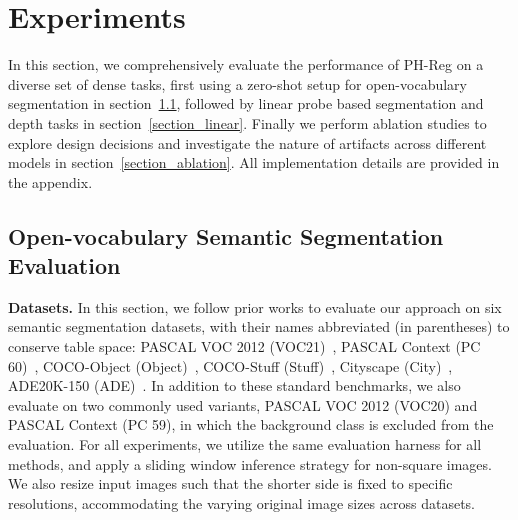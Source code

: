 \vspace{-.2cm}
\section{Experiments}
\vspace{-.2cm}
In this section, we comprehensively evaluate the performance of PH-Reg on a diverse set of dense tasks, first using a zero-shot setup for open-vocabulary segmentation in section~\ref{section_seg}, followed by linear probe based segmentation and depth tasks in section~\ref{section_linear}. Finally we perform ablation studies to explore design decisions and investigate the nature of artifacts across different models in section~\ref{section_ablation}.
All implementation details are provided in the appendix. 




\vspace{-.2cm}
\subsection{Open-vocabulary Semantic Segmentation Evaluation}
\label{section_seg}
\vspace{-.2cm}

\textbf{Datasets.} In this section, we follow prior works \citep{wang2024scliprethinkingselfattentiondense,hajimiri2025naclip,lan2024clearclip} to evaluate our approach on six semantic segmentation datasets, with their names abbreviated (in parentheses) to conserve table space: PASCAL VOC 2012 (VOC21)~\citep{everingham2015pascal}, PASCAL Context (PC 60)~\citep{context}, COCO-Object (Object)~\citep{cocoobjects}, COCO-Stuff (Stuff)~\citep{caesar2018coco}, Cityscape (City)~\citep{cordts2016cityscapes}, ADE20K-150 (ADE)~\citep{ade20k}. In addition to these standard benchmarks, we also evaluate on two commonly used variants, PASCAL VOC 2012 (VOC20) and PASCAL Context (PC 59), in which the background class is excluded from the evaluation. 
For all experiments, we utilize the same evaluation harness for all methods, and apply a sliding window inference strategy for non-square images. We also resize input images such that the shorter side is fixed to specific resolutions, accommodating the varying original image sizes across datasets. 

